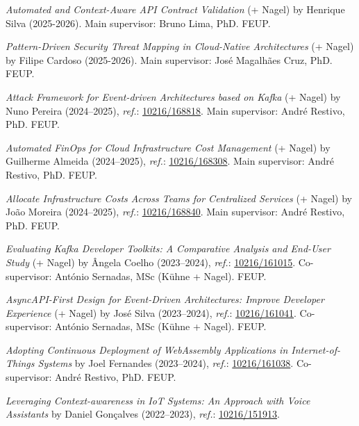 \documentclass[10pt, a4paper]{article}
\newcommand{\feup}{FEUP}
\let\oldhref\href
\renewcommand{\href}[2]{\oldhref{#1}{{\small #2}}}
\begin{document}
\begin{etaremune}
	\renewcommand\labelenumi{\footnotesize\theenumi .}
     \item \textit{Automated and Context-Aware API Contract Validation} ( + Nagel) by Henrique Silva (2025-2026).
     Main supervisor: Bruno Lima, PhD. \feup.
    \item \textit{Pattern-Driven Security Threat Mapping in Cloud-Native Architectures} ( + Nagel) by Filipe Cardoso (2025-2026).
    Main supervisor: José Magalhães Cruz, PhD. \feup.
    \item \textit{Attack Framework for Event-driven Architectures based on Kafka} ( + Nagel) by Nuno Pereira (2024--2025), \textit{ref.}: \href{https://hdl.handle.net/10216/168818}{10216/168818}.
	Main supervisor: André Restivo, PhD. \feup.
    \item \textit{Automated FinOps for Cloud Infrastructure Cost Management} ( + Nagel) by Guilherme Almeida (2024--2025), \textit{ref.}: \href{https://hdl.handle.net/10216/168308}{10216/168308}.
	Main supervisor: André Restivo, PhD. \feup.
    \item \textit{Allocate Infrastructure Costs Across Teams for Centralized Services} ( + Nagel) by João Moreira (2024--2025), \textit{ref.}: \href{https://hdl.handle.net/10216/168840}{10216/168840}.
	Main supervisor: André Restivo, PhD. \feup.
    \item \textit{Evaluating Kafka Developer Toolkits: A Comparative Analysis and End-User Study} ( + Nagel) by Ângela Coelho (2023--2024), \textit{ref.}: \href{https://hdl.handle.net/10216/161015}{10216/161015}.
	Co-supervisor: António Sernadas, MSc (Kühne + Nagel). \feup.
    \item \textit{AsyncAPI-First Design for Event-Driven Architectures: Improve Developer Experience} ( + Nagel) by José Silva (2023--2024), \textit{ref.}: \href{https://hdl.handle.net/10216/161041}{10216/161041}.
	Co-supervisor: António Sernadas, MSc (Kühne + Nagel). \feup.
    \item \textit{Adopting Continuous Deployment of WebAssembly Applications in Internet-of-Things Systems} by Joel Fernandes (2023--2024), \textit{ref.}: \href{https://hdl.handle.net/10216/161038}{10216/161038}.
	Co-supervisor: André Restivo, PhD. \feup.
	\item \textit{Leveraging Context-awareness in IoT Systems: An Approach with Voice Assistants} by Daniel Gonçalves (2022--2023), \textit{ref.}: \href{https://hdl.handle.net/10216/151913}{10216/151913}.

\end{etaremune}
\end{document}
